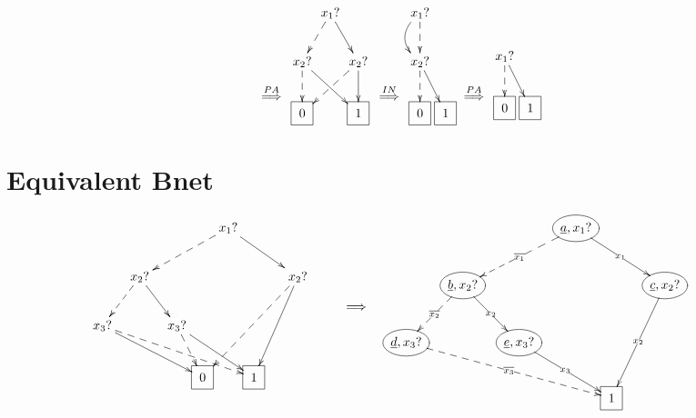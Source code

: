 $$
\xymatrix{\\\\\stackrel{PA}{\implies}}
\xymatrix@C=.1pc{
&x_1?\ar@{-->}[dl]\ar[dr]
\\
x_2?\ar@{-->}[d]\ar[drr]
&&x_2?\ar[d]\ar@{-->}[dll]
\\
\Rect{0}
&&\Rect{1}
}
\xymatrix{\\\\\stackrel{IN}{\implies}}
\xymatrix@C=.1pc{x_1?\ar@{-->}[d]\ar@/_1pc/[d]
\\
x_2?\ar@{-->}[d]\ar[dr]
\\
\Rect{0}
&\Rect{1}
}
\xymatrix{\\\\\stackrel{PA}{\implies}}
\xymatrix@C=.1pc{
\\
x_1?\ar@{-->}[d]\ar[dr]
\\
\Rect{0}
&\Rect{1}
}
$$





\section{Equivalent Bnet}
$$
\xymatrix@C=.1pc{
&&&&&&&x_1?\ar@{-->}[dllll]
\ar[drrrr]
\\
&&&x_2?\ar@{-->}[dll]\ar[drr]
&&&&&&&&x_2?\ar@{-->}[ddlllll]\ar[ddlll]
\\
&x_3?\ar@{-->}[drrrrrrr]\ar[drrrrr]
&&&&x_3?\ar@{-->}[dr]\ar[drrr]
\\
&&
&&
&&\Rect{0}
&&\Rect{1}
&&
&&
&&
}
\xymatrix{
\\\\\implies}
\xymatrix@C=.1pc{
&&&&&&&\Circle{\rva, x_1?}\ar@{-->}[dllll]|{\ol{x_1}}
\ar[drrrr]|{x_1}
\\
&&&\Circle{\rvb, x_2?}\ar@{-->}[dll]|{\ol{x_2}}\ar[drr]|{x_2}
&&&&&&&&\Circle{\rvc, x_2?}\ar[ddlll]|{x_2}
\\
&\Circle{\rvd, x_3?}\ar@{-->}[drrrrrrr]|{\ol{x_3}}
&&&&\Circle{\rve, x_3?}\ar[drrr]|{x_3}
\\
&&
&&
&&
&&\Rect{1}
&&
&&
&&
}
$$
